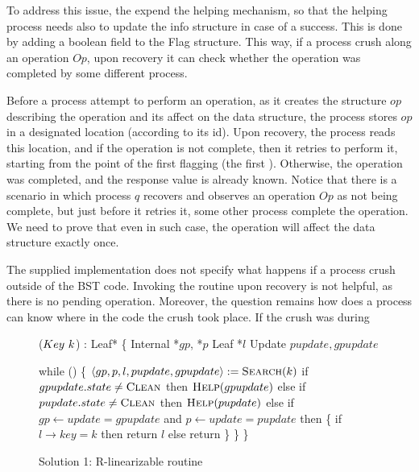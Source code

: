 To address this issue, the expend the helping mechanism, so that the helping process needs also to update the info structure in case of a success. This is done by adding a boolean field to the Flag structure. This way, if a process crush along an operation $Op$, upon recovery it can check whether the operation was completed by some different process. 

Before a process attempt to perform an operation, as it creates the \Flag structure $op$ describing the operation and its affect on the data structure, the process stores $op$ in a designated location (according to its id). Upon recovery, the process reads this location, and if the operation is not complete, then it retries to perform it, starting from the point of the first flagging (the first \CASB). Otherwise, the operation was completed, and the response value is already known. Notice that there is a scenario in which process $q$ recovers and observes an operation $Op$ as not being complete, but just before it retries it, some other process complete the operation. We need to prove that even in such case, the operation will affect the data structure exactly once.

The supplied implementation does not specify what happens if a process crush outside of the BST code. Invoking the  routine upon recovery is not helpful, as there is no pending operation. Moreover, the question remains how does a process can know where in the code the crush took place. If the crush was during 



\begin{figure*}
	\footnotesize
	
	\begin{code}
		($Key\ k$) : Leaf* \{ \nlc
		\n Internal *$gp$, *$p$\nlc
		Leaf *$l$\nlc
		Update $pupdate, gpupdate$\bl
		\nlc
		
		while (\TRUE) \{ \nlc \n
		$\langle gp, p, l, pupdate, gpupdate \rangle := \mbox{\sc Search}(k)$\nlc
		if $gpupdate.state \neq \mbox{\sc Clean}$ then $\mbox{\sc Help}(gpupdate)$ \nlc
		else if $pupdate.state \neq \mbox{\sc Clean}$ then $\mbox{\sc Help}(pupdate)$ \nlc
		else if $gp \leftarrow update = gpupdate$ and $p \leftarrow update = pupdate$ then \{ \nlc \n
		if $l \rightarrow key = k$ then return $l$ \nlc
		else return \NULL \nlc
		\p \} \nlc
		\p \} \nlc
		\p \}
	\end{code}
	
	\caption{Solution 1: R-linearizable  routine}
	\label{robust find - solution 1}
\end{figure*}



